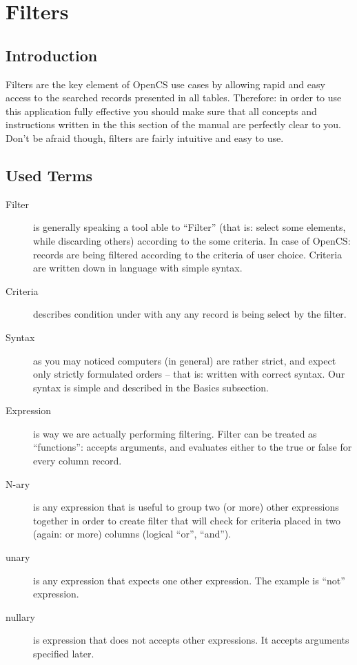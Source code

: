 \section{Filters}
\subsection{Introduction}
Filters are the key element of OpenCS use cases by allowing rapid and easy access to the searched records presented in all tables. Therefore: in order to use this application fully effective you should make sure that all concepts and instructions written in the this section of the manual are perfectly clear to you.\\
Don't be afraid though, filters are fairly intuitive and easy to use.

\subsection{Used Terms}

\begin{description}
 \item[Filter] is generally speaking a tool able to ``Filter'' (that is: select some elements, while discarding others) according to the some criteria. In case of OpenCS: records are being filtered according to the criteria of user choice. Criteria are written down in language with simple syntax.
 \item[Criteria] describes condition under with any any record is being select by the filter.
 \item[Syntax] as you may noticed computers (in general) are rather strict, and expect only strictly formulated orders -- that is: written with correct syntax. Our syntax is simple and described in the {B}asics subsection.
 \item[Expression] is way we are actually performing filtering. Filter can be treated as ``functions'': accepts arguments, and evaluates either to the true or false for every column record.
 \item[N-ary] is any expression that is useful to group two (or more) other expressions together in order to create filter that will check for criteria placed in two (again: or more) columns (logical ``or'', ``and'').
 \item[unary] is any expression that expects one other expression. The example is ``not'' expression.
 \item[nullary] is expression that does not accepts other expressions. It accepts arguments specified later.
\end{description}

